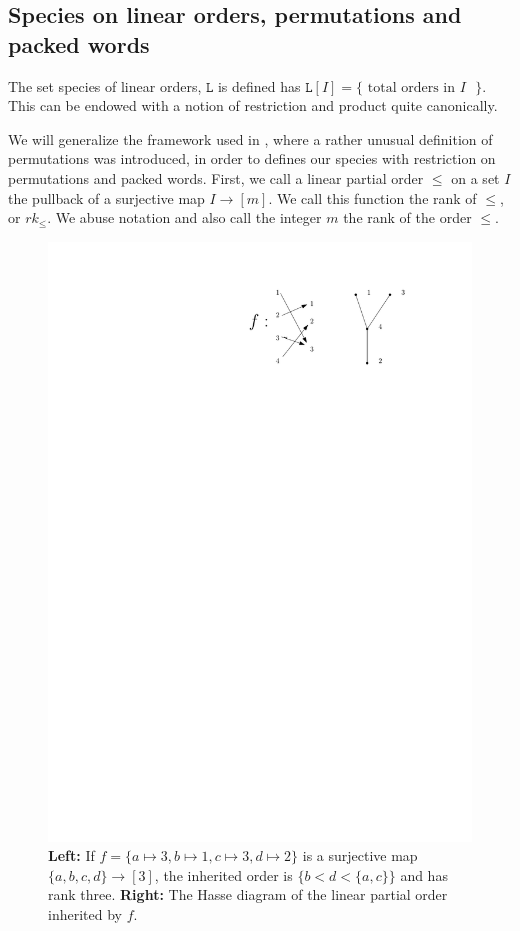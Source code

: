 \documentclass[submission]{FPSAC2023}
\theoremstyle{definition}
\begin{document}
\subsection{Species on linear orders, permutations and packed words\label{sec:speciespermutation}}

The set species of linear orders, $\mathtt{L}$ is defined has $\mathtt{L}[I] = \{\text{ total orders in $I$ }\}$.
This can be endowed with a notion of restriction and product quite canonically.

We will generalize the framework used in \cite{albert2020two}, where a rather unusual definition of permutations was introduced, in order to defines our species with restriction on permutations and packed words.  
First, we call a linear partial order $\leq$ on a set $I$ the pullback of a surjective map $I \to [m]$.
We call this function the rank of $\leq$, or $rk_{\leq}$.
We abuse notation and also call the integer $m$ the rank of the order $\leq$.

\begin{figure}[h]
	\centering
	\includegraphics[scale=.9]{../images/packedWordOrder.pdf}
	\caption{\textbf{Left:} If $f = \{ a\mapsto 3, b\mapsto 1, c\mapsto 3, d\mapsto 2\}$ is a surjective map $\{a, b, c, d\}\to[3]$, the inherited order is $\{b < d < \{a, c \}\}$ and has rank three. \textbf{Right:} The Hasse diagram of the linear partial order inherited by $f$. \label{fig:packedWordOrder}}
\end{figure}
\end{document}
